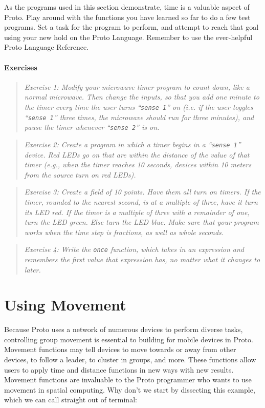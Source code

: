 \documentclass{article}
\newcommand\problem[1]{\begin{quote}{\em #1}\end{quote}}
\newcommand\var[1]{{\tt #1}}
\newcommand\qvar[1]{``{\tt #1}''}
\begin{document}
As the programs used in this section demonstrate, time is a valuable
aspect of Proto.  Play around with the functions you have learned so
far to do a few test programs.  Set a task for the program to perform,
and attempt to reach that goal using your new hold on the Proto
Language.  Remember to use the ever-helpful Proto Language Reference.

\paragraph{Exercises}

\problem{Exercise 1: Modify your microwave timer program to count
  down, like a normal microwave.  Then change the inputs, so that you
  add one minute to the timer every time the user turns \qvar{sense 1}
  on (i.e. if the user toggles \qvar{sense 1} three times, the
  microwave should run for three minutes), and pause the timer
  whenever \qvar{sense 2} is on.}

\problem{Exercise 2: Create a program in which a timer begins in a
  \qvar{sense 1} device.  Red LEDs go on that are within the distance
  of the value of that timer (e.g., when the timer reaches 10 seconds,
  devices within 10 meters from the source turn on red LEDs).}

\problem{Exercise 3: Create a field of 10 points. Have them all turn
  on timers.  If the timer, rounded to the nearest second, is at a
  multiple of three, have it turn its LED red.  If the timer is a
  multiple of three with a remainder of one, turn the LED green.  Else
  turn the LED blue.  Make sure that your program works when the time
  step is fractions, as well as whole seconds.}

\problem{Exercise 4: Write the \var{once} function, which takes in
  an expression and remembers the first value that expression has,
  no matter what it changes to later.}


\section{Using Movement}
\label{s:move}

Because Proto uses a network of numerous devices to perform diverse
tasks, controlling group movement is essential to building for mobile
devices in Proto.  Movement functions may tell devices to move
towards or away from other devices, to follow a leader, to cluster in
groups, and more.  These functions allow users to apply time and
distance functions in new ways with new results. Movement functions
are invaluable to the Proto programmer who wants to use movement in
spatial computing.  Why don't we start by dissecting this example,
which we can call straight out of terminal:
\end{document}
